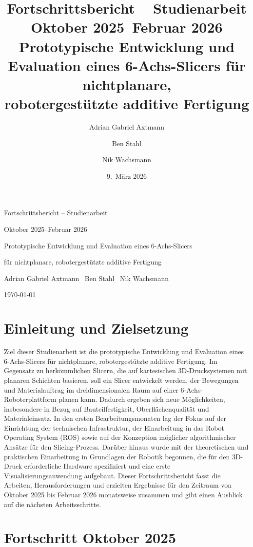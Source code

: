 \documentclass[
	paper=a4,
	fontsize=11pt,
	parskip=half,
	headings=normal,
	bibliography=totoc,
	listof=totoc
]{scrartcl}
\title{Fortschrittsbericht -- Studienarbeit\\[0.25em]
\large Oktober 2025--Februar 2026\\[0.5em]
\normalsize Prototypische Entwicklung und Evaluation eines 6-Achs-Slicers für nichtplanare,\\
robotergestützte additive Fertigung}
\author{Adrian Gabriel Axtmann \and Ben Stahl \and Nik Wachsmann}
\date{9.\ März 2026}
\begin{document}
\begin{titlepage}
	\centering
	{\Large Fortschrittsbericht -- Studienarbeit\par}
	\vspace{1.0cm}
	{\large Oktober 2025--Februar 2026\par}
	\vspace{1.25cm}
	{\LARGE Prototypische Entwicklung und Evaluation eines 6-Achs-Slicers\par}
	\vspace{0.25cm}
	{\Large für nichtplanare, robotergestützte additive Fertigung\par}
	\vspace{1.25cm}
	{\large Adrian Gabriel Axtmann \textbullet\ Ben Stahl \textbullet\ Nik Wachsmann\par}
	\vfill
	{\large \today\par}
\end{titlepage}

\tableofcontents
\newpage

\section{Einleitung und Zielsetzung}
	Ziel dieser Studienarbeit ist die prototypische Entwicklung und Evaluation eines 6-Achs-Slicers für nichtplanare, robotergestützte additive Fertigung.
	Im Gegensatz zu herkömmlichen Slicern, die auf kartesischen 3D-Drucksystemen mit planaren Schichten basieren, soll ein Slicer entwickelt werden, der Bewegungen und Materialauftrag im dreidimensionalen Raum auf einer 6-Achs-Roboterplattform planen kann.
	Dadurch ergeben sich neue Möglichkeiten, insbesondere in Bezug auf Bauteilfestigkeit, Oberflächenqualität und Materialeinsatz.
	In den ersten Bearbeitungsmonaten lag der Fokus auf der Einrichtung der technischen Infrastruktur, der Einarbeitung in das Robot Operating System (ROS) sowie auf der Konzeption möglicher algorithmischer Ansätze für den Slicing-Prozess.
	Darüber hinaus wurde mit der theoretischen und praktischen Einarbeitung in Grundlagen der Robotik begonnen, die für den 3D-Druck erforderliche Hardware spezifiziert und eine erste Visualisierungsanwendung aufgebaut.
	Dieser Fortschrittsbericht fasst die Arbeiten, Herausforderungen und erzielten Ergebnisse für den Zeitraum von Oktober 2025 bis Februar 2026 monatsweise zusammen und gibt einen Ausblick auf die nächsten Arbeitsschritte.

\section{Fortschritt Oktober 2025}
\end{document}
